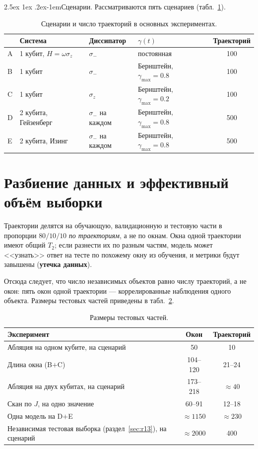 \documentclass[12pt,a4paper]{report}
\makeatletter
\renewcommand\paragraph{\@startsection{paragraph}{4}{\z@}%
  {2.5ex \@plus1ex \@minus.2ex}{-1em}{\normalfont\normalsize\bfseries}}
\numberwithin{equation}{chapter}
\makeatother
\begin{document}
\paragraph{Сценарии.} Рассматриваются пять сценариев
(табл.~\ref{tab:scenarios}).

\begin{table}[h]
\centering
\caption{Сценарии и число траекторий в основных экспериментах.}
\label{tab:scenarios}
\small
\begin{tabular}{@{}llllc@{}}
\toprule
 & Система & Диссипатор & $\gamma(t)$ & Траекторий \\
\midrule
A & 1 кубит, $H=\omega\sigma_z$ & $\sigma_-$ & постоянная & 100 \\
B & 1 кубит & $\sigma_-$ & Бернштейн, $\gamma_{\max}=0.8$ & 100 \\
C & 1 кубит & $\sigma_z$ & Бернштейн, $\gamma_{\max}=0.2$ & 100 \\
D & 2 кубита, Гейзенберг & $\sigma_-$ на каждом & Бернштейн, $\gamma_{\max}=0.8$ & 500 \\
E & 2 кубита, Изинг & $\sigma_-$ на каждом & Бернштейн, $\gamma_{\max}=0.8$ & 500 \\
\bottomrule
\end{tabular}
\end{table}

\section{Разбиение данных и эффективный объём выборки}
\label{sec:split}

Траектории делятся на обучающую, валидационную и тестовую части в пропорции
$80/10/10$ \emph{по траекториям}, а не по окнам. Окна одной траектории имеют
общий $T_2$; если разнести их по разным частям, модель может <<узнать>> ответ на
тесте по похожему окну из обучения, и метрики будут завышены (\textbf{утечка
данных}).

Отсюда следует, что число независимых объектов равно числу траекторий, а не
окон: пять окон одной траектории --- коррелированные наблюдения одного объекта.
Размеры тестовых частей приведены в табл.~\ref{tab:testsize}.

\begin{table}[h]
\centering
\caption{Размеры тестовых частей.}
\label{tab:testsize}
\small
\begin{tabular}{@{}lcc@{}}
\toprule
Эксперимент & Окон & Траекторий \\
\midrule
Абляция на одном кубите, на сценарий & 50 & 10 \\
Длина окна (B$+$C) & 104--120 & 21--24 \\
Абляция на двух кубитах, на сценарий & 173--218 & $\approx40$ \\
Скан по $J$, на одно значение & 60--91 & 12--18 \\
Одна модель на D$+$E & $\approx1150$ & $\approx230$ \\
Независимая тестовая выборка (раздел~\ref{sec:r13}), на сценарий & $\approx2000$ & 400 \\
\bottomrule
\end{tabular}
\end{table}
\end{document}
